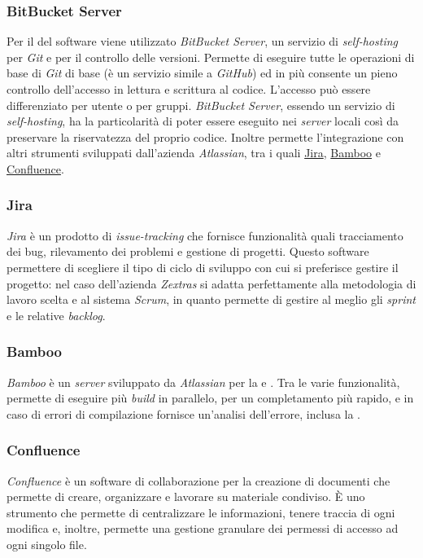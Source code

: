 \subsubsection{BitBucket Server}
Per il  del software viene utilizzato \emph{BitBucket Server}, un servizio di \emph{self-hosting} per  \emph{Git} e per il controllo delle versioni. Permette di eseguire tutte le operazioni di base di \emph{Git} di base (è un servizio simile a \emph{GitHub}) ed in più consente un pieno controllo dell'accesso in lettura e scrittura al codice. L'accesso può essere differenziato per utente o per gruppi. \emph{BitBucket Server}, essendo un servizio di \emph{self-hosting}, ha la particolarità di poter essere eseguito nei \emph{server} locali così da preservare la riservatezza del proprio codice. Inoltre permette l'integrazione con altri strumenti sviluppati dall'azienda \emph{Atlassian}, tra i quali \hyperref[subsubsec:jira]{Jira}, \hyperref[subsubsec:bamboo]{Bamboo} e \hyperref[subsubsec:confluence]{Confluence}.
\subsubsection{Jira}\label{subsubsec:jira}
\emph{Jira} è un prodotto di \emph{issue-tracking} che fornisce funzionalità quali tracciamento dei bug, rilevamento dei problemi e gestione di progetti. Questo software permettere di scegliere il tipo di ciclo di sviluppo con cui si preferisce gestire il progetto: nel caso dell'azienda \emph{Zextras} si adatta perfettamente alla metodologia di lavoro scelta e al sistema \emph{Scrum}, in quanto permette di gestire al meglio gli \emph{sprint} e le relative \emph{backlog}.
\subsubsection{Bamboo}\label{subsubsec:bamboo}
\emph{Bamboo} è un \emph{server} sviluppato da \emph{Atlassian} per la  e . Tra le varie funzionalità, permette di eseguire più \emph{build} in parallelo, per un completamento più rapido, e in caso di errori di compilazione fornisce un'analisi dell'errore, inclusa la .
\subsubsection{Confluence}\label{subsubsec:confluence}
\emph{Confluence} è un software di collaborazione per la creazione di documenti che permette di creare, organizzare e lavorare su materiale condiviso. È uno strumento che permette di centralizzare le informazioni, tenere traccia di ogni modifica e, inoltre, permette una gestione granulare dei permessi di accesso ad ogni singolo file.

